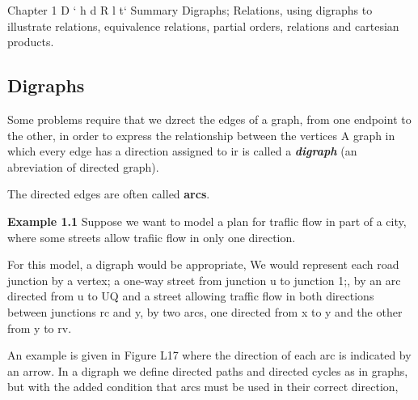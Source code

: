\documentclass[]{article}
\begin{document}
Chapter 1
D ` h d R l t`
Summary
Digraphs; Relations, using digraphs to illustrate relations, equivalence relations,
partial orders, relations and cartesian products.

\subsection*{Digraphs}
Some problems require that we dzrect the edges of a graph, from one endpoint to
the other, in order to express the relationship between the vertices A graph in
which every edge has a direction assigned to ir is called a \textit{\textbf{digraph}} (an abreviation
of directed graph). 

The directed edges are often called \textbf{arcs}.


\noindent\textbf{Example 1.1} Suppose we want to model a plan for traflic flow in part of a city,
where some streets allow trafiic flow in only one direction. 

For this model, a digraph would be appropriate, We would represent each road junction by a vertex; a one-way street from junction u to junction 1;, by an arc directed from u to UQ and a street allowing traffic flow in both directions between junctions rc and y, by two
arcs, one directed from x to y and the other from y to rv. 

An example is given in
Figure L17 where the direction of each arc is indicated by an arrow.
In a digraph we define directed paths and directed cycles as in graphs, but
with the added condition that arcs must be used in their correct direction, 
\end{document}
